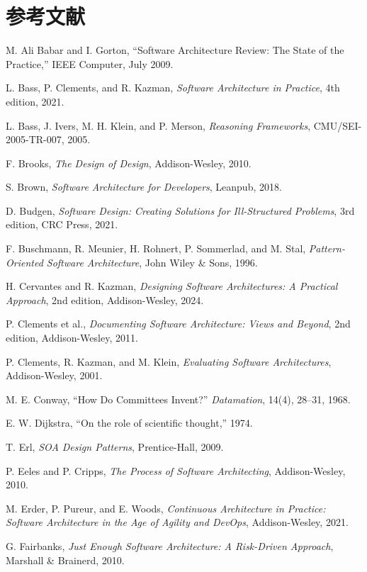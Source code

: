 \documentclass[a4paper,11pt]{ltjsarticle}
\begin{document}
\section{参考文献}
{\small\sloppy
\begin{enumerate}[label={[\arabic*]},leftmargin=2.5em]
\item M. Ali Babar and I. Gorton, ``Software Architecture Review: The State of the Practice,'' IEEE Computer, July 2009.
\item L. Bass, P. Clements, and R. Kazman, \textit{Software Architecture in Practice}, 4th edition, 2021.
\item L. Bass, J. Ivers, M. H. Klein, and P. Merson, \textit{Reasoning Frameworks}, CMU/SEI-2005-TR-007, 2005.
\item F. Brooks, \textit{The Design of Design}, Addison-Wesley, 2010.
\item S. Brown, \textit{Software Architecture for Developers}, Leanpub, 2018.
\item D. Budgen, \textit{Software Design: Creating Solutions for Ill-Structured Problems}, 3rd edition, CRC Press, 2021.
\item F. Buschmann, R. Meunier, H. Rohnert, P. Sommerlad, and M. Stal, \textit{Pattern-Oriented Software Architecture}, John Wiley \& Sons, 1996.
\item H. Cervantes and R. Kazman, \textit{Designing Software Architectures: A Practical Approach}, 2nd edition, Addison-Wesley, 2024.
\item P. Clements et al., \textit{Documenting Software Architecture: Views and Beyond}, 2nd edition, Addison-Wesley, 2011.
\item P. Clements, R. Kazman, and M. Klein, \textit{Evaluating Software Architectures}, Addison-Wesley, 2001.
\item M. E. Conway, ``How Do Committees Invent?'' \textit{Datamation}, 14(4), 28--31, 1968.
\item E. W. Dijkstra, ``On the role of scientific thought,'' 1974.
\item T. Erl, \textit{SOA Design Patterns}, Prentice-Hall, 2009.
\item P. Eeles and P. Cripps, \textit{The Process of Software Architecting}, Addison-Wesley, 2010.
\item M. Erder, P. Pureur, and E. Woods, \textit{Continuous Architecture in Practice: Software Architecture in the Age of Agility and DevOps}, Addison-Wesley, 2021.
\item G. Fairbanks, \textit{Just Enough Software Architecture: A Risk-Driven Approach}, Marshall \& Brainerd, 2010.

\end{enumerate}}
\end{document}
